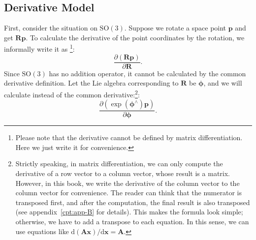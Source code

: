 \subsection{Derivative Model}
First, consider the situation on $\mathrm{SO}(3)$. Suppose we rotate a space point $\mathbf{p}$ and get $\mathbf{R} \mathbf{p}$. To calculate the derivative of the point coordinates by the rotation, we informally write it as \footnote{Please note that the derivative cannot be defined by matrix differentiation. Here we just write it for convenience. }:
\[
\frac{{\partial \left( {\mathbf{Rp}} \right)}}{{\partial \mathbf{R}}}.
\]
Since $\mathrm{SO}(3)$ has no addition operator, it cannot be calculated by the common derivative definition. Let the Lie algebra corresponding to $\mathbf{R}$ be $\boldsymbol{\phi}$, and we will calculate instead of the common derivative:\footnote{Strictly speaking, in matrix differentiation, we can only compute the derivative of a row vector to a column vector, whose result is a matrix. However, in this book, we write the derivative of the column vector to the column vector for convenience. The reader can think that the numerator is transposed first, and after the computation, the final result is also transposed (see appendix~\ref{cpt:app-B} for details). This makes the formula look simple; otherwise, we have to add a transpose to each equation. In this sense, we can use equations like $\mathrm{d}(\mathbf{Ax})/\mathrm{d}\mathbf{x} = \mathbf{A}$. }:
\[ \frac{{\partial \left( {\exp \left( \boldsymbol{\phi} ^ \wedge \right) \mathbf{p}} \right)}}{{\partial \boldsymbol{\phi} }}. \]

